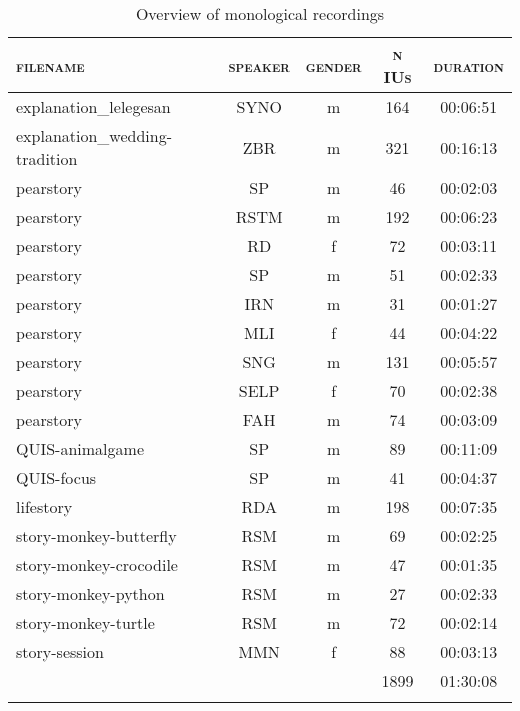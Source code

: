 
\begin{table}[h!]
	\caption{Overview of monological recordings}
	\label{Overview_monol}
	\begin{tabular}{lcccc}
		\lsptoprule
		\textsc{filename} & \textsc{speaker} & \textsc{gender} & \textsc{n IUs} & \textsc{duration} \\
		\midrule
		explanation\_lelegesan & SYNO & m & 164 & 00:06:51 \\
		explanation\_wedding-tradition & ZBR & m & 321 & 00:16:13 \\
		pearstory & SP & m & 46 & 00:02:03 \\
		pearstory & RSTM & m & 192 & 00:06:23 \\
		pearstory & RD & f & 72 & 00:03:11 \\
		pearstory & SP & m & 51 & 00:02:33 \\
		pearstory & IRN & m & 31 & 00:01:27 \\
		pearstory & MLI & f & 44 & 00:04:22 \\
		pearstory & SNG & m & 131 & 00:05:57 \\
		pearstory & SELP & f & 70 & 00:02:38 \\
		pearstory & FAH & m & 74 & 00:03:09 \\
		QUIS-animalgame & SP & m & 89 & 00:11:09 \\
		QUIS-focus & SP & m & 41 & 00:04:37 \\
		lifestory & RDA & m & 198 & 00:07:35 \\
		story-monkey-butterfly & RSM & m & 69 & 00:02:25 \\
		story-monkey-crocodile & RSM & m & 47 & 00:01:35 \\
		story-monkey-python & RSM & m & 27 & 00:02:33 \\
		story-monkey-turtle & RSM & m & 72 & 00:02:14 \\
		story-session & MMN & f & 88 & 00:03:13 \\ \midrule
		& & & 1899 & 01:30:08 \\ 
		\lspbottomrule
	\end{tabular}
\end{table}
